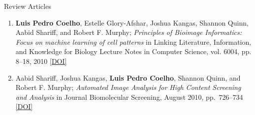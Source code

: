 \documentclass{article}
\renewcommand\subsection[1]{%
    \par\vspace{.1em}%
    {\hspace{1em}\subsubhead #1}%
    \par\vspace{.2em}%
}
\newcommand\showdoi[1]{%
    \href{http://dx.doi.org/#1}{[DOI]}%
}
\begin{document}
\subsection{Review Articles}
\begin{enumerate}
\item \textbf{Luis Pedro Coelho}, Estelle Glory-Afshar, Joshua Kangas, Shannon
Quinn, Aabid Shariff, and Robert F. Murphy; \emph{Principles of Bioimage
Informatics: Focus on machine learning of cell patterns} in Linking Literature,
Information, and Knowledge for Biology Lecture Notes in Computer Science, vol.
6004, pp. 8--18, 2010 \showdoi{10.1007/978-3-642-13131-8_2}

\item Aabid Shariff, Joshua Kangas, \textbf{Luis Pedro Coelho}, Shannon Quinn,
and Robert F. Murphy; \emph{Automated Image Analysis for High Content Screening
and Analysis} in Journal Biomolecular Screening, August 2010, pp.\ 726--734
\showdoi{10.1177/1087057110370894}

\end{enumerate}
\end{document}
